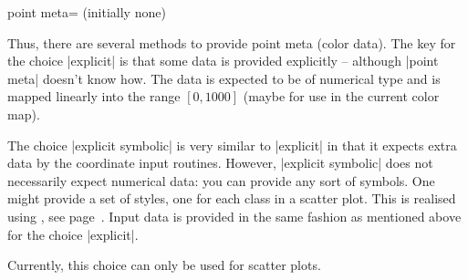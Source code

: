 \begin{pgfplotskey}{point meta= (initially none)}
\begin{description}
\begin{codeexample}
\end{codeexample}
		Thus, there are several methods to provide point meta (color data). The key for the choice |explicit| is that some data is provided explicitly -- although |point meta| doesn't know how. The data is expected to be of numerical type and is mapped linearly into the range $[0,1000]$ (maybe for use in the current color map).

		\item[\declaretext{explicit symbolic}] The choice |explicit symbolic| is very similar to |explicit| in that it expects extra data by the coordinate input routines. However, |explicit symbolic| does not necessarily expect numerical data: you can provide any sort of symbols. One might provide a set of styles, one for each class in a scatter plot. This is realised using , see page~\pageref{pgfplots:scatterclasses}. Input data is provided in the same fashion as mentioned above for the choice |explicit|. 
		
		Currently, this choice can only be used for scatter plots.


\end{description}
\end{pgfplotskey}
